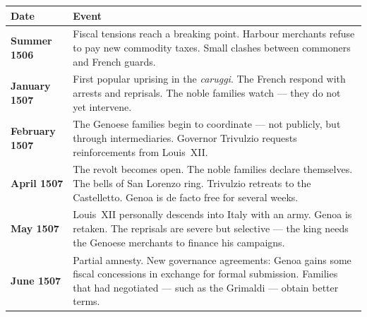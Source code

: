\begin{center}
\begin{tabularx}{\textwidth}{L{3.2cm} X}
  \toprule
  \textbf{Date} & \textbf{Event} \\
  \midrule
  \textbf{Summer 1506} &
    Fiscal tensions reach a breaking point. Harbour merchants refuse to
    pay new commodity taxes. Small clashes between commoners and French guards. \\

  \textbf{January 1507} &
    First popular uprising in the \textit{caruggi}. The French respond
    with arrests and reprisals. The noble families watch --- they do not
    yet intervene. \\

  \textbf{February 1507} &
    The Genoese families begin to coordinate --- not publicly, but through
    intermediaries. Governor Trivulzio requests reinforcements from
    Louis~XII. \\

  \textbf{April 1507} &
    The revolt becomes open. The noble families declare themselves.
    The bells of San Lorenzo ring. Trivulzio retreats to the Castelletto.
    Genoa is de facto free for several weeks. \\

  \textbf{May 1507} &
    Louis~XII personally descends into Italy with an army. Genoa is
    retaken. The reprisals are severe but selective --- the king needs
    the Genoese merchants to finance his campaigns. \\

  \textbf{June 1507} &
    Partial amnesty. New governance agreements: Genoa gains some fiscal
    concessions in exchange for formal submission. Families that had
    negotiated --- such as the Grimaldi --- obtain better terms. \\
  \bottomrule
\end{tabularx}
\end{center}

